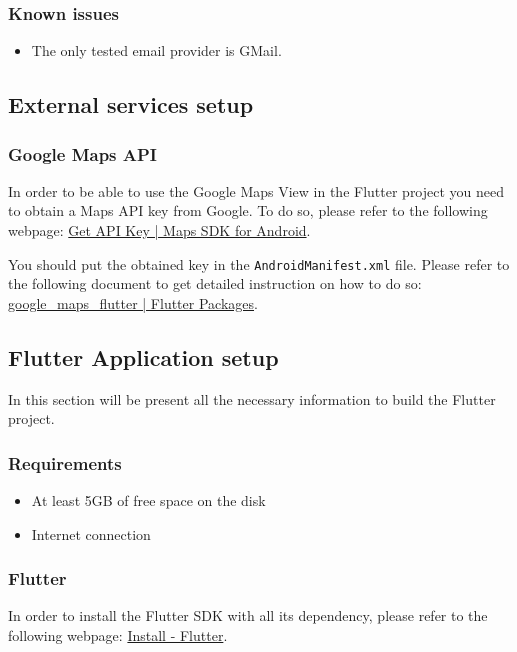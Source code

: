 \subsubsection{Known issues}
\begin{itemize}
    \item The only tested email provider is GMail.
\end{itemize}

\subsection{External services setup}
\subsubsection{Google Maps API}
In order to be able to use the Google Maps View in the Flutter project you need to obtain a Maps API key from Google. To do so, please refer to the following webpage:
\href{https://developers.google.com/maps/documentation/android-sdk/signup}{Get API Key | Maps SDK for Android}.

You should put the obtained key in the \texttt{AndroidManifest.xml} file. Please refer to the following document to get detailed instruction on how to do so:
\href{https://pub.dartlang.org/packages/google_maps_flutter}{google\_maps\_flutter | Flutter Packages}.

\newpage
\subsection{Flutter Application setup}
In this section will be present all the necessary information to build the Flutter project.
\subsubsection{Requirements}
\begin{itemize}
\item At least 5GB of free space on the disk
    \item Internet connection
\end{itemize}

\subsubsection{Flutter}
In order to install the Flutter SDK with all its dependency, please refer to the following webpage: \href{https://flutter.io/docs/get-started/install}{Install - Flutter}.

